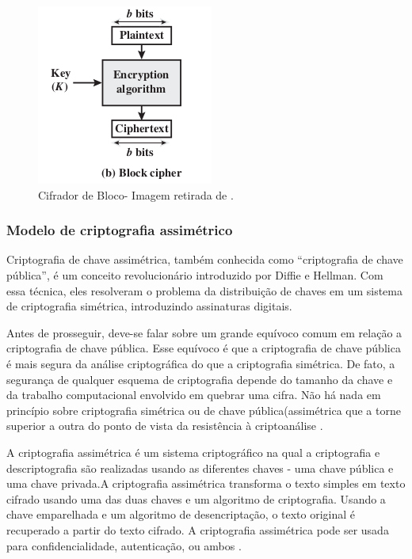                 \begin{figure}[H]
                     \centering
                     \includegraphics[scale=0.7]{figuras/capitulo_2/block_cipher.png}
                     \caption{Cifrador de Bloco- Imagem retirada de \cite{cryptograpy_and_network_stallings}.}
                     \label{fig:imagem_block_cipher}
                \end{figure}
            
            
        \subsubsection{Modelo de criptografia assimétrico}
        
                Criptografia de chave assimétrica, também conhecida como “criptografia de chave pública”, é um conceito revolucionário introduzido por Diffie e Hellman. Com essa técnica, eles resolveram o problema da distribuição de chaves em um sistema de criptografia simétrica, introduzindo assinaturas digitais.\cite{beginnig_blockchain_bikramaditya}
                
                Antes de prosseguir, deve-se falar sobre um grande equívoco comum em relação a criptografia de chave pública. Esse equívoco é que a criptografia de chave pública é mais segura da análise criptográfica do que a criptografia simétrica. De fato, a segurança de qualquer esquema de criptografia depende do tamanho da chave e da trabalho computacional envolvido em quebrar uma cifra. Não há nada em princípio sobre criptografia simétrica ou de chave pública(assimétrica que a torne superior a outra do ponto de vista da resistência à criptoanálise \cite{cryptograpy_and_network_stallings}.

                A criptografia assimétrica é um sistema criptográfico na qual a criptografia
                e descriptografia são realizadas usando as diferentes chaves - uma chave pública e uma chave privada.A criptografia assimétrica transforma o texto simples em texto cifrado usando uma das duas chaves e um algoritmo de criptografia. Usando a chave emparelhada e um algoritmo de desencriptação, o texto original é recuperado a partir do texto cifrado. A criptografia assimétrica pode ser usada para confidencialidade, autenticação, ou ambos   \cite{cryptograpy_and_network_stallings}.

